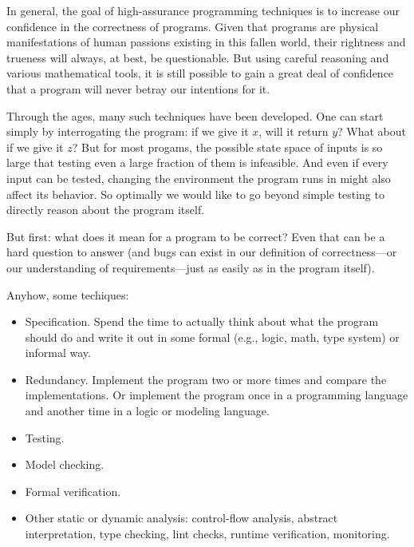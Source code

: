 In general, the goal of high-assurance programming techniques is to increase our
confidence in the correctness of programs. Given that programs are physical
manifestations of human passions existing in this fallen world, their rightness
and trueness will always, at best, be questionable. But using careful reasoning
and various mathematical tools, it is still possible to gain a great deal of
confidence that a program will never betray our intentions for it.

Through the ages, many such techniques have been developed. One can start simply
by interrogating the program: if we give it $x$, will it return $y$? What
about if we give it $z$? But for most progams, the possible state space of
inputs is so large that testing even a large fraction of them is infeasible. And
even if every input can be tested, changing the environment the program runs in
might also affect its behavior. So optimally we would like to go beyond simple
testing to directly reason about the program itself.

But first: what does it mean for a program to be correct? Even that can be a
hard question to answer (and bugs can exist in our definition of
correctness---or our understanding of requirements---just as easily as in the
program itself).

Anyhow, some techiques:

\begin{itemize}

\item Specification. Spend the time to actually think about what the program
should do and write it out in some formal (e.g., logic, math, type system) or
informal way.

\item Redundancy. Implement the program two or more times and compare the
implementations. Or implement the program once in a programming language and
another time in a logic or modeling language.

\item Testing.

\item Model checking.

\item Formal verification.

\item Other static or dynamic analysis: control-flow analysis, abstract
interpretation, type checking, lint checks, runtime verification, monitoring.

\end{itemize}

